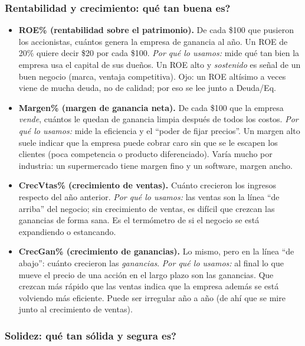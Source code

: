 \documentclass[11pt,a4paper]{article}
\begin{document}
\subsubsection*{Rentabilidad y crecimiento: \textquestiondown{}qu\'e tan buena es?}

\begin{itemize}[leftmargin=1.4em]
  \item \textbf{ROE\% (rentabilidad sobre el patrimonio).} De cada \$100 que pusieron
  los accionistas, cu\'antos genera la empresa de ganancia al a\~no. Un ROE de 20\%
  quiere decir \$20 por cada \$100. \emph{Por qu\'e lo usamos:} mide qu\'e tan bien la
  empresa usa el capital de sus due\~nos. Un ROE alto y \emph{sostenido} es se\~nal de
  un buen negocio (marca, ventaja competitiva). Ojo: un ROE alt\'isimo a veces viene de
  mucha deuda, no de calidad; por eso se lee junto a Deuda/Eq.
  \item \textbf{Margen\% (margen de ganancia neta).} De cada \$100 que la empresa
  \emph{vende}, cu\'antos le quedan de ganancia limpia despu\'es de todos los costos.
  \emph{Por qu\'e lo usamos:} mide la eficiencia y el ``poder de fijar precios''. Un
  margen alto suele indicar que la empresa puede cobrar caro sin que se le escapen los
  clientes (poca competencia o producto diferenciado). Var\'ia mucho por industria: un
  supermercado tiene margen fino y un software, margen ancho.
  \item \textbf{CrecVtas\% (crecimiento de ventas).} Cu\'anto crecieron los ingresos
  respecto del a\~no anterior. \emph{Por qu\'e lo usamos:} las ventas son la l\'inea
  ``de arriba'' del negocio; sin crecimiento de ventas, es dif\'icil que crezcan las
  ganancias de forma sana. Es el term\'ometro de si el negocio se est\'a expandiendo o
  estancando.
  \item \textbf{CrecGan\% (crecimiento de ganancias).} Lo mismo, pero en la l\'inea ``de
  abajo'': cu\'anto crecieron las \emph{ganancias}. \emph{Por qu\'e lo usamos:} al final
  lo que mueve el precio de una acci\'on en el largo plazo son las ganancias. Que
  crezcan m\'as r\'apido que las ventas indica que la empresa adem\'as se est\'a
  volviendo m\'as eficiente. Puede ser irregular a\~no a a\~no (de ah\'i que se mire
  junto al crecimiento de ventas).
\end{itemize}

\subsubsection*{Solidez: \textquestiondown{}qu\'e tan s\'olida y segura es?}
\end{document}
